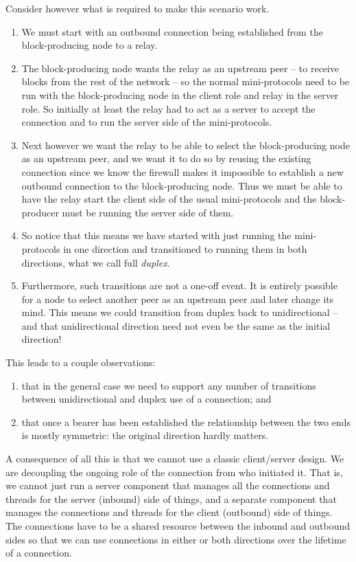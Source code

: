 Consider however what is required to make this scenario work.
\begin{enumerate}
\item We must start with an outbound connection being established from the
      block-producing node to a relay.
\item The block-producing node wants the relay as an upstream peer -- to
      receive blocks from the rest of the network -- so the normal
      mini-protocols need to be run with the block-producing node in the client
      role and relay in the server role. So initially at least the relay had to
      act as a server to accept the connection and to run the server side of
      the mini-protocols.
\item Next however we want the relay to be able to select the block-producing
      node as an upstream peer, and we want it to do so by reusing the existing
      connection since we know the firewall makes it impossible to establish a
      new outbound connection to the block-producing node. Thus we must be able
      to have the relay start the client side of the usual mini-protocols and
      the block-producer must be running the server side of them.
\item So notice that this means we have started with just running the
      mini-protocols in one direction and transitioned to running them in both
      directions, what we call full \emph{duplex}.
\item Furthermore, such transitions are not a one-off event. It is entirely
      possible for a node to select another peer as an upstream peer and later
      change its mind. This means we could transition from duplex back to
      unidirectional -- and that unidirectional direction need not even be the
      same as the initial direction!
\end{enumerate}
This leads to a couple observations:
\begin{enumerate}
\item that in the general case we need to support any number of transitions
      between unidirectional and duplex use of a connection; and
\item that once a bearer has been established the relationship between the two
      ends is mostly symmetric: the original direction hardly matters.
\end{enumerate}

A consequence of all this is that we cannot use a classic client/server design.
We are decoupling the ongoing role of the connection from who initiated it.
That is, we cannot just run a server component that manages all the connections
and threads for the server (inbound) side of things, and a separate component
that manages the connections and threads for the client (outbound) side of
things. The connections have to be a shared resource between the inbound and
outbound sides so that we can use connections in either or both directions
over the lifetime of a connection.

